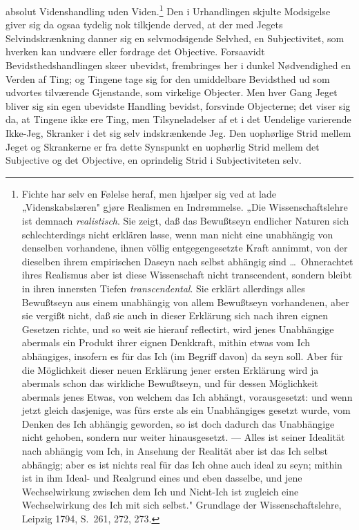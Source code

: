 \documentclass[12pt]{book}
\newcommand{\opage}[1]{\marginnote{\footnotesize\textit{[#1]}}}
\begin{document}
absolut Videnshandling uden Viden.\footnote{Fichte har selv en Følelse heraf, men
hjælper sig ved at lade „Videnskabslæren" gjøre Realismen en Indrømmelse. „Die
Wissenschaftslehre ist demnach \emph{realistisch}. Sie zeigt, daß das Bewußtseyn
endlicher Naturen sich schlechterdings nicht erklären lasse, wenn man nicht eine
unabhängig von denselben vorhandene, ihnen völlig entgegengesetzte Kraft annimmt, von
der dieselben ihrem empirischen Daseyn nach selbst abhängig sind \dots\ Ohnerachtet
ihres Realismus aber ist diese Wissenschaft nicht transcendent, sondern bleibt in
ihren innersten Tiefen \emph{transcendental}. Sie erklärt allerdings alles Bewußtseyn
aus einem unabhängig von allem Bewußtseyn vorhandenen, aber sie vergißt nicht, daß
sie auch in dieser Erklärung sich nach ihren eignen Gesetzen richte, und so weit sie
hierauf reflectirt, wird jenes Unabhängige abermals ein Produkt ihrer eignen
Denkkraft, mithin etwas vom Ich abhängiges, insofern es für das Ich (im Begriff
davon) da seyn soll. Aber für die Möglichkeit dieser neuen Erklärung jener ersten
Erklärung wird ja abermals schon das wirkliche Bewußtseyn, und für dessen
Möglichkeit abermals jenes Etwas, von welchem das Ich abhängt, vorausgesetzt: und
wenn jetzt gleich dasjenige, was fürs erste als ein Unabhängiges gesetzt wurde, vom
Denken des Ich abhängig geworden, so ist doch dadurch das Unabhängige nicht gehoben,
sondern nur weiter hinausgesetzt. --- Alles ist seiner Idealität nach abhängig vom
Ich, in Ansehung der Realität aber ist das Ich selbst abhängig; aber es ist nichts
real für das Ich ohne auch ideal zu seyn; mithin ist in ihm Ideal- und Realgrund
eines und eben dasselbe, und jene Wechselwirkung zwischen dem Ich und Nicht-Ich ist
zugleich eine Wechselwirkung des Ich mit sich selbst." Grundlage der
Wissenschaftslehre, Leipzig 1794, S.~261, 272, 273.} Den i Urhandlingen skjulte
\opage{35} Modsigelse giver sig da ogsaa tydelig nok tilkjende derved, at der med Jegets
Selvindskrænkning danner sig en selvmodsigende Selvhed, en Subjectivitet, som hverken
kan undvære eller fordrage det Objective. Forsaavidt Bevidsthedshandlingen skeer
ubevidst, frembringes her i dunkel Nødvendighed en Verden af Ting; og Tingene tage
sig for den umiddelbare Bevidsthed ud som udvortes tilværende Gjenstande, som
virkelige Objecter. Men hver Gang Jeget bliver sig sin egen ubevidste Handling
bevidst, forsvinde Objecterne; det viser sig da, at Tingene ikke ere Ting, men
Tilsyneladelser af et i det Uendelige varierende Ikke-Jeg, Skranker i det sig selv
indskrænkende Jeg. Den uophørlige Strid mellem Jeget og Skrankerne er fra dette
Synspunkt en uophørlig Strid mellem det Subjective og det Objective, en oprindelig
Strid i Subjectiviteten selv.
\end{document}

